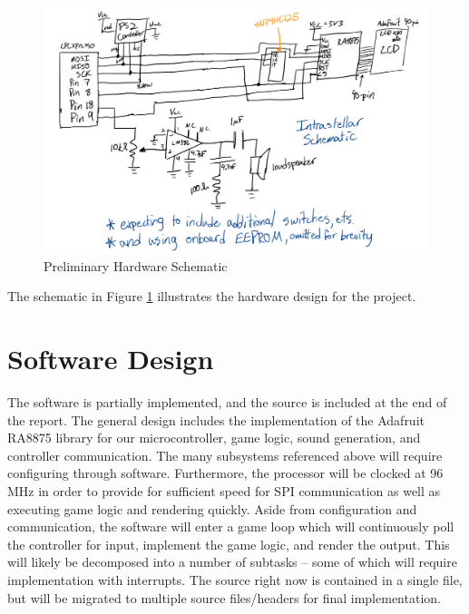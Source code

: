 \documentclass[a4paper, 12pt]{article}
\begin{document}
\begin{figure}[h!]
  \centering
  \includegraphics[scale=.18]{schematic.png}
  \caption{Preliminary Hardware Schematic}
  \label{fig:schematic}
\end{figure}

The schematic in Figure \ref{fig:schematic} illustrates the hardware design for the project. 

\section*{Software Design}
The software is partially implemented, and the source is included at the end of the report. The general design includes the implementation of the Adafruit RA8875 library for our microcontroller, game logic, sound generation, and controller communication. The many subsystems referenced above will require configuring through software. Furthermore, the processor will be clocked at 96 MHz in order to provide for sufficient speed for SPI communication as well as executing game logic and rendering quickly. Aside from configuration and communication, the software will enter a game loop which will continuously poll the controller for input, implement the game logic, and render the output. This will likely be decomposed into a number of subtasks -- some of which will require implementation with interrupts. The source right now is contained in a single file, but will be migrated to multiple source files/headers for final implementation. 
\end{document}
